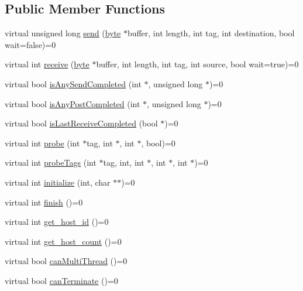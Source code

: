 \subsection*{Public Member Functions}
\begin{DoxyCompactItemize}
\item 
virtual unsigned long \hyperlink{class_i_network_a4996a6c20805f604c5afff707313ed4e}{send} (\hyperlink{engine_8hpp_a0c8186d9b9b7880309c27230bbb5e69d}{byte} $\ast$buffer, int length, int tag, int destination, bool wait=false)=0
\item 
virtual int \hyperlink{class_i_network_a6578b7160209dfc342be9b5658621625}{receive} (\hyperlink{engine_8hpp_a0c8186d9b9b7880309c27230bbb5e69d}{byte} $\ast$buffer, int length, int tag, int source, bool wait=true)=0
\item 
virtual bool \hyperlink{class_i_network_a4cf6eb047a7d028c3c4c023b59293061}{isAnySendCompleted} (int $\ast$, unsigned long $\ast$)=0
\item 
virtual bool \hyperlink{class_i_network_a9e465b7489fd53410d3cb9ed532c4894}{isAnyPostCompleted} (int $\ast$, unsigned long $\ast$)=0
\item 
virtual bool \hyperlink{class_i_network_af6f98db34182f9ab4d705619eaabde2b}{isLastReceiveCompleted} (bool $\ast$)=0
\item 
virtual int \hyperlink{class_i_network_ab653bd28450c18a74826d06069ed3ed1}{probe} (int $\ast$tag, int $\ast$, int $\ast$, bool)=0
\item 
virtual int \hyperlink{class_i_network_a85b398c3932251d6c0d9698004eb01e7}{probeTags} (int $\ast$tag, int, int $\ast$, int $\ast$, int $\ast$)=0
\item 
virtual int \hyperlink{class_i_network_a5c706262a4275f321687a189686a2b81}{initialize} (int, char $\ast$$\ast$)=0
\item 
virtual int \hyperlink{class_i_network_a667e56ba7f3713c949f84573ae710a85}{finish} ()=0
\item 
virtual int \hyperlink{class_i_network_aef01bb260a8e60c7c9085b381cf86f13}{get\_\-host\_\-id} ()=0
\item 
virtual int \hyperlink{class_i_network_a24bd475422706998cbee500825728d55}{get\_\-host\_\-count} ()=0
\item 
virtual bool \hyperlink{class_i_network_aad8a4fcd575712d1ef795f1133e17916}{canMultiThread} ()=0
\item 
virtual bool \hyperlink{class_i_network_a49a4daa697317d6fc065897a7926c26c}{canTerminate} ()=0
\item 
$$
\end{DoxyCompactItemize}
